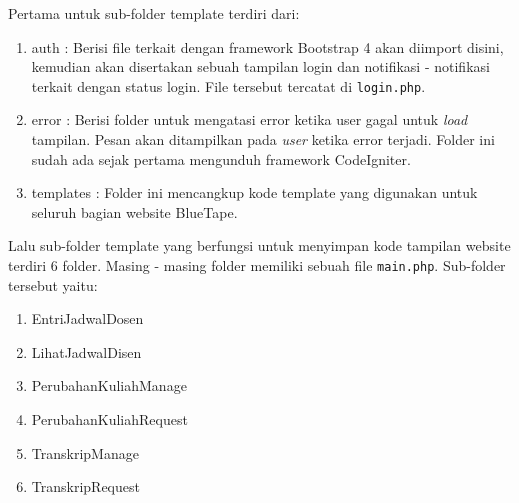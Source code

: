 Pertama untuk sub-folder template terdiri dari: 
\begin{enumerate}
	\item auth	: Berisi file terkait dengan framework Bootstrap 4 akan diimport disini, kemudian akan disertakan sebuah tampilan login dan notifikasi - notifikasi terkait dengan status login. File tersebut tercatat di \texttt{login.php}.
	\item error	: Berisi folder untuk mengatasi error ketika user gagal untuk \textit{load} tampilan. Pesan akan ditampilkan pada \textit{user} ketika error terjadi. Folder ini sudah ada sejak pertama mengunduh framework CodeIgniter.
	\item templates	: Folder ini mencangkup kode template yang digunakan untuk seluruh bagian website BlueTape. 
\end{enumerate}

Lalu sub-folder template yang berfungsi untuk menyimpan kode tampilan website terdiri 6 folder. Masing - masing folder memiliki sebuah file \texttt{main.php}. Sub-folder tersebut yaitu:
\begin{enumerate}
	\item EntriJadwalDosen
	\item LihatJadwalDisen
	\item PerubahanKuliahManage
	\item PerubahanKuliahRequest
	\item TranskripManage
	\item TranskripRequest
\end{enumerate}


